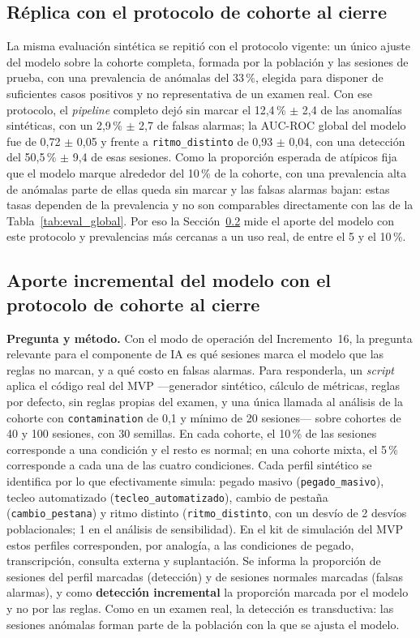 \subsection{Réplica con el protocolo de cohorte al cierre}
\label{sec:eval_replica_cierre}

La misma evaluación sintética se repitió con el protocolo vigente: un único ajuste del modelo sobre la cohorte completa, formada por la población y las sesiones de prueba, con una prevalencia de anómalas del 33\,\%, elegida para disponer de suficientes casos positivos y no representativa de un examen real. Con ese protocolo, el \textit{pipeline} completo dejó sin marcar el 12,4\,\% $\pm$ 2,4 de las anomalías sintéticas, con un 2,9\,\% $\pm$ 2,7 de falsas alarmas; la AUC-ROC global del modelo fue de 0,72 $\pm$ 0,05 y frente a \texttt{ritmo\_distinto} de 0,93 $\pm$ 0,04, con una detección del 50,5\,\% $\pm$ 9,4 de esas sesiones. Como la proporción esperada de atípicos fija que el modelo marque alrededor del 10\,\% de la cohorte, con una prevalencia alta de anómalas parte de ellas queda sin marcar y las falsas alarmas bajan: estas tasas dependen de la prevalencia y no son comparables directamente con las de la Tabla~\ref{tab:eval_global}. Por eso la Sección~\ref{sec:eval_aporte_modelo} mide el aporte del modelo con este protocolo y prevalencias más cercanas a un uso real, de entre el 5 y el 10\,\%.

\subsection{Aporte incremental del modelo con el protocolo de cohorte al cierre}
\label{sec:eval_aporte_modelo}

\textbf{Pregunta y método.} Con el modo de operación del Incremento~16, la pregunta relevante para el componente de IA es qué sesiones marca el modelo que las reglas no marcan, y a qué costo en falsas alarmas. Para responderla, un \textit{script} aplica el código real del MVP ---generador sintético, cálculo de métricas, reglas por defecto, sin reglas propias del examen, y una única llamada al análisis de la cohorte con \texttt{contamination} de 0{,}1 y mínimo de 20 sesiones--- sobre cohortes de 40 y 100 sesiones, con 30 semillas. En cada cohorte, el 10\,\% de las sesiones corresponde a una condición y el resto es normal; en una cohorte mixta, el 5\,\% corresponde a cada una de las cuatro condiciones. Cada perfil sintético se identifica por lo que efectivamente simula: pegado masivo (\texttt{pegado\_masivo}), tecleo automatizado (\texttt{tecleo\_automatizado}), cambio de pestaña (\texttt{cambio\_pestana}) y ritmo distinto (\texttt{ritmo\_distinto}, con un desvío de 2 desvíos poblacionales; 1 en el análisis de sensibilidad). En el kit de simulación del MVP estos perfiles corresponden, por analogía, a las condiciones de pegado, transcripción, consulta externa y suplantación. Se informa la proporción de sesiones del perfil marcadas (detección) y de sesiones normales marcadas (falsas alarmas), y como \textbf{detección incremental} la proporción marcada por el modelo y no por las reglas. Como en un examen real, la detección es transductiva: las sesiones anómalas forman parte de la población con la que se ajusta el modelo.

